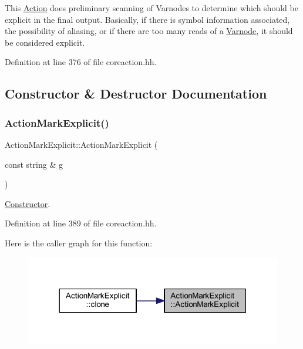 This \mbox{\hyperlink{class_action}{Action}} does preliminary scanning of Varnodes to determine which should be explicit in the final output. Basically, if there is symbol information associated, the possibility of aliasing, or if there are too many reads of a \mbox{\hyperlink{class_varnode}{Varnode}}, it should be considered explicit. 

Definition at line 376 of file coreaction.\+hh.



\subsection{Constructor \& Destructor Documentation}
\mbox{\label{class_action_mark_explicit_a731311c495d412cd5eccee301baea2ba}} 
\subsubsection{\texorpdfstring{ActionMarkExplicit()}{ActionMarkExplicit()}}
{\footnotesize\ttfamily Action\+Mark\+Explicit\+::\+Action\+Mark\+Explicit (\begin{DoxyParamCaption}\item[{const string \&}]{g }\end{DoxyParamCaption})\hspace{0.3cm}{\ttfamily [inline]}}



\mbox{\hyperlink{class_constructor}{Constructor}}. 



Definition at line 389 of file coreaction.\+hh.

Here is the caller graph for this function\+:
\nopagebreak
\begin{figure}[H]
\begin{center}
\leavevmode
\includegraphics[width=318pt]{class_action_mark_explicit_a731311c495d412cd5eccee301baea2ba_icgraph}
\end{center}
\end{figure}


